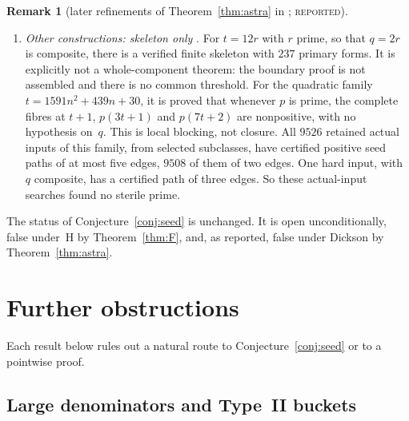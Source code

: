 \documentclass[11pt,reqno]{amsart}
\theoremstyle{definition}
\newtheorem{remark}[theorem]{Remark}
\newcommand{\status}[1]{\textsc{#1}}
\begin{document}
\begin{remark}[later refinements of Theorem~\ref{thm:astra} in \cite{AS}; \status{reported}]
\begin{enumerate}
for all sufficiently large $n$; no numerical threshold is asserted.  On
this progression, the prime hypothesis on $F$ implies~$L$.  This is \emph{not} a theorem
assuming only $158$ primes.  Realising $L$ with composite $F=8933R$, on
$n\equiv8439\pmod{8933}$, still uses Dickson's conjecture for $159$
affine forms; $F$ is then replaced by $R$.  It produces an extra Type~II
vertex, whose boundary is closed exactly.  At the actual primes
$R=6502739$ and $q=851971523327$, with $p=20447316559849$ prime, this
two-vertex attachment was certified with only the existing $h=2$ port
open.  That input is not on the packet's progression, and the other $158$
conditions are not claimed there.  This is a local check, not a
sterile-seed certificate.
\item \emph{Other constructions: skeleton only}
\cite[\texttt{TWELVE\_HUB\_SKELETON.md}, \texttt{NORM\_SEED\_FAMILIES.md}]{AS}.
For $t=12r$ with $r$ prime, so that $q=2r$ is composite, there is a
verified finite skeleton with $237$ primary forms.  It is explicitly not a
whole-component theorem: the boundary proof is not assembled and there is
no common threshold.  For the quadratic family $t=1591n^2+439n+30$, it is
proved that whenever $p$ is prime, the complete fibres at $t+1$,
$p(3t+1)$ and $p(7t+2)$ are nonpositive, with no hypothesis on~$q$.  This
is local blocking, not closure.  All $9526$ retained actual inputs of this
family, from selected subclasses, have certified positive seed paths of
at most five edges, $9508$ of them of two edges.  One hard input,
with $q$ composite, has a certified path of three edges.  So these actual-input
searches found no sterile prime.
\end{enumerate}
The status of Conjecture~\ref{conj:seed} is unchanged.  It is open
unconditionally, false under~H by Theorem~\ref{thm:F}, and, as reported,
false under Dickson by Theorem~\ref{thm:astra}.
\end{remark}

\section{Further obstructions}\label{sec:further}

Each result below rules out a natural route to Conjecture~\ref{conj:seed}
or to a pointwise proof.

\subsection{Large denominators and Type~II buckets}
\end{document}
